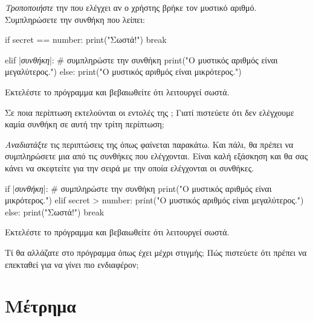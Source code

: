 \documentclass[a4paper,11pt,oneside]{book}
\begin{document}
\begin{step}
\emph{Τροποποιήστε} την  που ελέγχει αν ο χρήστης βρήκε τον μυστικό αριθμό. Συμπληρώσετε την συνθήκη που λείπει:

\begin{pyplain}
    if secret == number:
        print("Σωστά!")
        break
\end{pyplain}
\begin{pynew}
    elif |\textrm{\textit{συνθήκη}}|: # συμπληρώστε την συνθήκη
        print("Ο μυστικός αριθμός είναι μεγαλύτερος.")
    else:
        print("Ο μυστικός αριθμός είναι μικρότερος.")
\end{pynew}

Εκτελέστε το πρόγραμμα και βεβαιωθείτε ότι λειτουργεί σωστά. 

Σε ποια περίπτωση εκτελούνται οι εντολές της ; Γιατί πιστεύετε ότι δεν ελέγχουμε καμία συνθήκη σε αυτή την τρίτη περίπτωση;

\marginnote[14pt]{\icondiscuss}
\dottedline

\dottedline

\dottedline
\end{step}

\begin{step}
\emph{Αναδιατάξτε} τις περιπτώσεις της  όπως φαίνεται παρακάτω. Και πάλι, θα πρέπει να συμπληρώσετε μια από τις συνθήκες που ελέγχονται. Είναι καλή εξάσκηση και θα σας κάνει να σκεφτείτε για την σειρά με την οποία ελέγχονται οι συνθήκες.

\begin{pynew}
    if |\textrm{\textit{συνθήκη}}|: # συμπληρώστε την συνθήκη
        print("Ο μυστικός αριθμός είναι μικρότερος.")
    elif secret > number:
        print("Ο μυστικός αριθμός είναι μεγαλύτερος.")
    else:
        print("Σωστά!")
        break
\end{pynew}

Εκτελέστε το πρόγραμμα και βεβαιωθείτε ότι λειτουργεί σωστά. 

Τί θα αλλάζατε στο πρόγραμμα όπως έχει μέχρι στιγμής; Πώς πιστεύετε ότι πρέπει να επεκταθεί για να γίνει πιο ενδιαφέρον;

\marginnote[14pt]{\icondiscuss}
\dottedline

\dottedline
\end{step}

\section{Μέτρημα}
\end{document}
